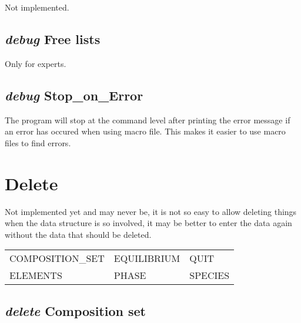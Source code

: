 \documentclass[12pt]{article}
\begin{document}
Not implemented.

\subsection{{\em debug} Free lists}

Only for experts.

\subsection{{\em debug} Stop\_on\_Error}

The program will stop at the command level after printing the error
message if an error has occured when using macro file.  This makes it
easier to use macro files to find errors.

\section{Delete }

Not implemented yet and may never be, it is not so easy to allow
deleting things when the data structure is so involved, it may be
better to enter the data again without the data that should be
deleted.

\begin{tabular}{lll}
 COMPOSITION\_SET & EQUILIBRIUM &     QUIT\\
 ELEMENTS         & PHASE        &    SPECIES\\
\end{tabular}

\subsection{{\em delete} Composition set}
\end{document}
